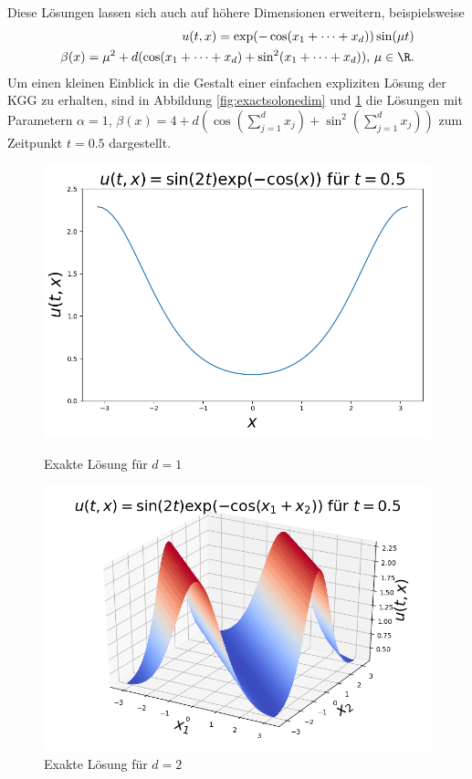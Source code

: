 Diese Lösungen lassen sich auch auf höhere Dimensionen erweitern, beispielsweise
\begin{eqnarray}
u(t,x)=\exp(-\cos(x_1+\dots+x_d))\sin(\mu t)\\
\beta(x)=\mu^2+d(\cos(x_1+\dots+x_d)+\sin^2(x_1+\dots+x_d)), \, \mu\in\R. \nonumber
\end{eqnarray}
Um einen kleinen Einblick in die Gestalt einer einfachen expliziten Lösung der KGG zu erhalten, sind in Abbildung \ref{fig:exactsolonedim} und \ref{fig:exactsoltwodim} die Lösungen mit Parametern $\alpha=1$, $\beta(x)=4+d(\cos(\sum_{j=1}^dx_j)+\sin^2(\sum_{j=1}^dx_j))$ zum Zeitpunkt $t=0.5$ dargestellt.
\begin{figure}[!htb]
  \includegraphics[width=\linewidth]{Figures/kgg_exact_solution_example1d.png}
  \caption{Exakte Lösung für $d=1$}
  \label{fig:exactsolonedim}
\endminipage
{}
  \includegraphics[width=\linewidth]{Figures/kgg_exact_solution_example2d.png}
  \caption{Exakte Lösung für $d=2$}
  \label{fig:exactsoltwodim}
\endminipage
\captionsetup{labelformat=empty}
\end{figure}

